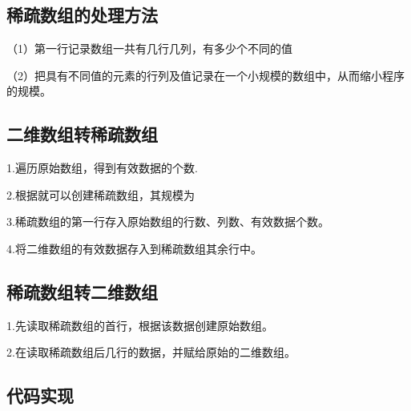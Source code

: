 \documentclass[a4paper]{report}
\begin{document}
\subsection{稀疏数组的处理方法}

（1）第一行记录数组一共有几行几列，有多少个不同的值

（2）把具有不同值的元素的行列及值记录在一个小规模的数组中，从而缩小程序的规模。

\subsection{二维数组转稀疏数组}

1.遍历原始数组，得到有效数据的个数.

2.根据就可以创建稀疏数组，其规模为

3.稀疏数组的第一行存入原始数组的行数、列数、有效数据个数。

4.将二维数组的有效数据存入到稀疏数组其余行中。

\subsection{稀疏数组转二维数组}
1.先读取稀疏数组的首行，根据该数据创建原始数组。

2.在读取稀疏数组后几行的数据，并赋给原始的二维数组。

\subsection{代码实现}
\end{document}
